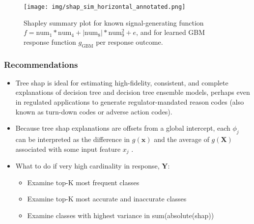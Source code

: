\documentclass{article}
\begin{document}
\begin{figure}[H]
	\begin{center}
		\texttt{[image: img/shap\_sim\_horizontal\_annotated.png]}
		\captionsetup{font=footnotesize}
		\caption{Shapley summary plot for known signal-generating function $f = \text{num} _1 * \text{num}_4 + |\text{num}_8| * \text{num}_9^2 + e$, and for learned GBM response function $g_{\text{GBM}}$ per response outcome.}
		\label{fig:global_feature_imp}
	\end{center}
\end{figure}
\FloatBarrier

\subsubsection{Recommendations}

\begin{itemize}
	
	\item Tree shap is ideal for estimating high-fidelity, consistent, and complete explanations of decision tree and decision tree ensemble models, perhaps even in regulated applications to generate regulator-mandated reason codes (also known as turn-down codes or adverse action codes).
	
	\item Because tree shap explanations are offsets from a global intercept, each $\phi_j$ can be interpreted as the difference in $g(\mathbf{x})$ and the average of $g(\mathbf{X})$ associated with some input feature $x_j$ \cite{molnar}. 

\item What to do if very high cardinality in response, $\mathbf{Y}$:

\begin{itemize}

  \item Examine top-K most frequent classes
  \item Examine top-K most accurate and inaccurate classes
  \item Examine classes with highest variance in sum(absolute(shap))

\end{itemize}

\end{itemize}

\end{document}
